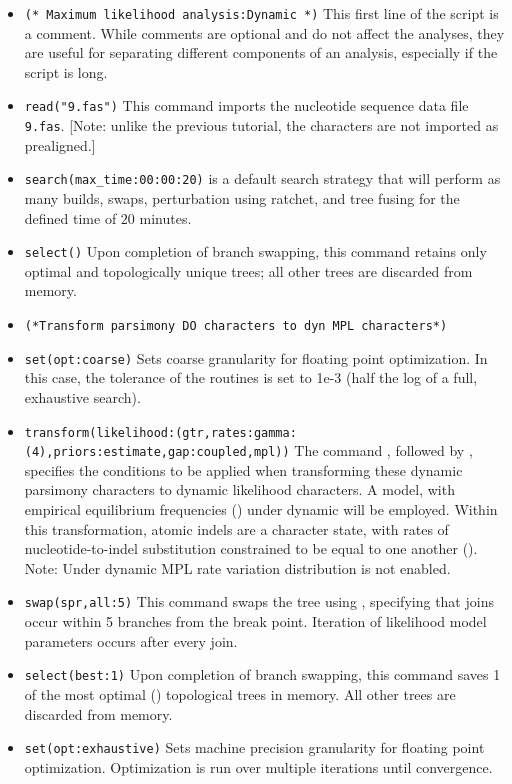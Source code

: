 \begin{itemize}
\item \texttt{(* Maximum likelihood analysis:Dynamic *)} This first line of the script is a comment. 
While comments are optional and do not affect the analyses, they are useful for separating different 
components of an analysis, especially if the script is long.  
\item \texttt{read("9.fas")} This command imports the nucleotide sequence data file \texttt{9.fas}.
[Note: unlike the previous tutorial, the characters are not imported as prealigned.]
\item \texttt{search(max\_time:00:00:20)}  is a default search strategy that 
will perform as many builds, swaps, perturbation using ratchet, and tree fusing for the defined time 
of $ 20 $ minutes.
\item \texttt{select()} Upon completion of branch swapping, this command retains only optimal and 
topologically unique trees; all other trees are discarded from memory.

\item \texttt{(*Transform parsimony DO characters to dyn MPL characters*)}
\item \texttt{set(opt:coarse)} Sets coarse granularity for floating point optimization. In this case, the 
tolerance of the routines is set to 1e-3 (half the log of a full, exhaustive search).

\item \texttt{transform(likelihood:(gtr,rates:gamma:(4),priors:estimate,gap:coupled,mpl))} The command 
, followed by , specifies the conditions to be 
applied when transforming these dynamic parsimony characters to dynamic likelihood characters.  
A  model, with empirical equilibrium frequencies () 
under dynamic  will be employed. Within this transformation, atomic indels are 
a character state, with rates of nucleotide-to-indel substitution constrained to be equal to one another 
(). Note: Under dynamic MPL rate variation distribution is not enabled.
\item \texttt{swap(spr,all:5)} This command swaps the tree using , specifying that joins occur
within 5 branches from the break point. Iteration of likelihood model parameters occurs after every join.
\item \texttt{select(best:1)} Upon completion of branch swapping, this command saves 1 of the most optimal 
() topological trees in memory. All other trees are discarded from memory.
\item \texttt{set(opt:exhaustive)} Sets machine precision granularity for floating point optimization. 
Optimization is run over multiple iterations until convergence.


\end{itemize}
